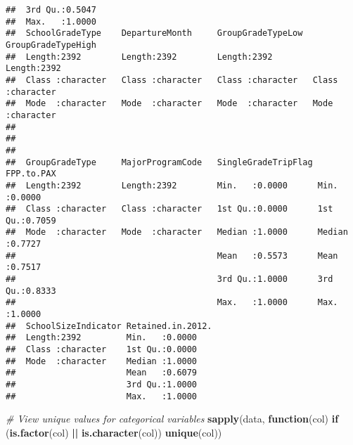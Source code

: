 \documentclass[
]{article}
\newenvironment{Shaded}{\begin{snugshade}}{\end{snugshade}}
\newcommand{\CommentTok}[1]{\textcolor[rgb]{0.56,0.35,0.01}{\textit{#1}}}
\newcommand{\ControlFlowTok}[1]{\textcolor[rgb]{0.13,0.29,0.53}{\textbf{#1}}}
\newcommand{\FunctionTok}[1]{\textcolor[rgb]{0.13,0.29,0.53}{\textbf{#1}}}
\newcommand{\NormalTok}[1]{#1}
\newcommand{\SpecialCharTok}[1]{\textcolor[rgb]{0.81,0.36,0.00}{\textbf{#1}}}
\begin{document}
\begin{verbatim}
##  3rd Qu.:0.5047                                                       
##  Max.   :1.0000                                                       
##  SchoolGradeType    DepartureMonth     GroupGradeTypeLow  GroupGradeTypeHigh
##  Length:2392        Length:2392        Length:2392        Length:2392       
##  Class :character   Class :character   Class :character   Class :character  
##  Mode  :character   Mode  :character   Mode  :character   Mode  :character  
##                                                                             
##                                                                             
##                                                                             
##  GroupGradeType     MajorProgramCode   SingleGradeTripFlag   FPP.to.PAX    
##  Length:2392        Length:2392        Min.   :0.0000      Min.   :0.0000  
##  Class :character   Class :character   1st Qu.:0.0000      1st Qu.:0.7059  
##  Mode  :character   Mode  :character   Median :1.0000      Median :0.7727  
##                                        Mean   :0.5573      Mean   :0.7517  
##                                        3rd Qu.:1.0000      3rd Qu.:0.8333  
##                                        Max.   :1.0000      Max.   :1.0000  
##  SchoolSizeIndicator Retained.in.2012.
##  Length:2392         Min.   :0.0000   
##  Class :character    1st Qu.:0.0000   
##  Mode  :character    Median :1.0000   
##                      Mean   :0.6079   
##                      3rd Qu.:1.0000   
##                      Max.   :1.0000
\end{verbatim}

\begin{Shaded}
\begin{Highlighting}[]
\CommentTok{\# View unique values for categorical variables}
\FunctionTok{sapply}\NormalTok{(data, }\ControlFlowTok{function}\NormalTok{(col) }\ControlFlowTok{if}\NormalTok{ (}\FunctionTok{is.factor}\NormalTok{(col) }\SpecialCharTok{||} \FunctionTok{is.character}\NormalTok{(col)) }\FunctionTok{unique}\NormalTok{(col))}
\end{Highlighting}
\end{Shaded}
\end{document}
